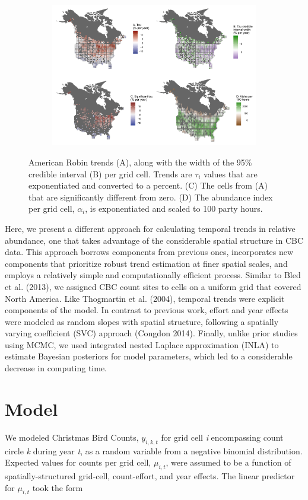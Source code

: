 \documentclass[]{article}
\begin{document}
\begin{figure}[t]
  \centering
  \begin{subfigure}[t]{0.99\textwidth}
    \centering
    \includegraphics[width=\textwidth]{tau_alpha} 
  \end{subfigure}
  \caption{American Robin trends (A), along with the width of the 95\% credible interval (B) per grid cell. Trends are $\tau_i$ values that are exponentiated and converted to a percent. (C) The cells from (A) that are significantly different from zero. (D) The abundance index per grid cell, $\alpha_i$, is exponentiated and scaled to 100 party hours.}
\end{figure}

Here, we present a different approach for calculating temporal trends in relative abundance, one that takes advantage of the considerable spatial structure in CBC data. This approach borrows components from previous ones, incorporates new components that prioritize robust trend estimation at finer spatial scales, and employs a relatively simple and computationally efficient process. Similar to Bled et al. (2013), we assigned CBC count sites to cells on a uniform grid that covered North America. Like Thogmartin et al. (2004), temporal trends were explicit components of the model. In contrast to previous work, effort and year effects were modeled as random slopes with spatial structure, following a spatially varying coefficient (SVC) approach (Congdon 2014). Finally, unlike prior studies using MCMC, we used integrated nested Laplace approximation (INLA) to estimate Bayesian posteriors for model parameters, which led to a considerable decrease in computing time.

\section{Model}
We modeled Christmas Bird Counts, $y_{i,k,t}$ for grid cell \textit{i} encompassing count circle \textit{k} during year \textit{t}, as a random variable from a negative binomial distribution. Expected values for counts per grid cell, $\mu_{i,t}$, were assumed to be a function of spatially-structured grid-cell, count-effort, and year effects. The linear predictor for $\mu_{i,t}$ took the form
\end{document}
